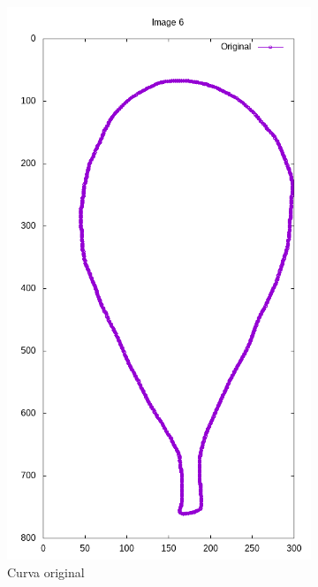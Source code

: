 \begin{frame}
	\begin{figure}[ht!]
		\centering
		\begin{subfigure}[t]{0.24\textwidth}
			\centering
			\includegraphics[width=\textwidth]{img/rec/6ori.png}
			\caption{Curva original}
		\end{subfigure}
		\begin{subfigure}[t]{0.24\textwidth}
			\centering

\end{subfigure}
\end{figure}
\end{frame}

